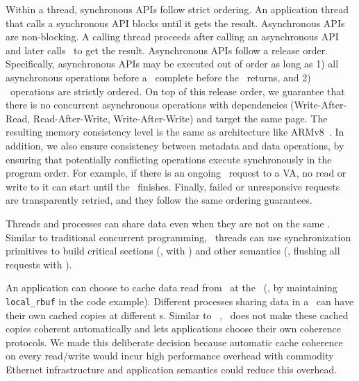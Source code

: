 

Within a thread, synchronous APIs follow strict ordering.
An application thread that calls a synchronous API blocks until it gets the result.
Asynchronous APIs are non-blocking. A calling thread proceeds after calling an asynchronous API and later calls \poll\ to get the result. 
Asynchronous APIs follow a release order.
Specifically, asynchronous APIs may be executed out of order as long as
1) all asynchronous operations before a \release\ complete before the \release\ returns,
and 2) \release\ operations are strictly ordered.
On top of this release order, 
we guarantee that there is no concurrent asynchronous operations with dependencies (Write-After-Read, Read-After-Write, Write-After-Write) and target the same page.
The resulting memory consistency level is the same as architecture like ARMv8~\cite{ARMv8}.
In addition, we also ensure consistency between metadata and data operations, by ensuring that potentially conflicting operations execute synchronously in the program order. For example, if there is an ongoing \sysfree\ request to a VA, no read or write to it can start until the \sysfree\ finishes.
Finally, failed or unresponsive requests are transparently retried, and they follow the same ordering guarantees.

Threads and processes can share data even when they are not on the same \CN.
Similar to traditional concurrent programming, \sys\ threads can use synchronization primitives to build critical sections (\eg, with \syslock) 
and other semantics (\eg, flushing all requests with \fence).

An application can choose to cache data read from \Cliosysread\ at the \CN\ (\eg, by maintaining \texttt{local\_rbuf} in the code example).
Different processes sharing data in a \rspace\ can have their own cached copies at different \CN{}s.
Similar to ~\cite{Shan18-OSDI}, \sys\ does not make these cached copies coherent automatically and lets applications choose their own coherence
protocols.
We made this deliberate decision because automatic cache coherence on every read/write would incur  high performance overhead with commodity Ethernet infrastructure
and application semantics could reduce this overhead.

